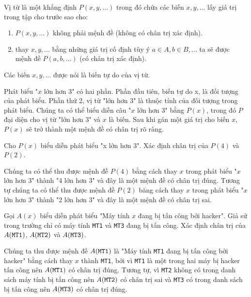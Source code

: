 \documentclass[11pt,fleqn]{book} %
\begin{document}
        \begin{definition}
            Vị từ là một khẳng định $P(x, y, ...)$ trong đó chứa các biến $x, y, ...$ lấy giá trị trong tập cho trước sao cho:
            \begin{enumerate}
                \item $P(x, y, ...)$ không phải mệnh đề (không có chân trị xác định).
                \item thay $x, y, ...$ bằng những giá trị cố định tùy ý $a \in A, b \in B, ...$ ta sẽ được mệnh đề $P(a, b, ...)$ (có chân trị xác định).
            \end{enumerate}
            Các biến $x, y, ...$ được nói là biến tự do của vị từ.
        \end{definition}
        
        Phát biểu "$x$ lớn hơn 3" có hai phần. Phần đầu tiên, biến tự do x, là đối tượng của phát biểu. Phần thứ 2, vị từ "lớn hơn 3" là thuộc tính của đối tượng trong phát biểu. Chúng ta có thể biểu diễn câu "$x$ lớn hơn 3" bằng $P(x)$, trong đó $P$ đại diện cho vị từ "lớn hơn 3" và $x$ là biến. Sau khi gán một giá trị cho biến $x$, $P(x)$ sẽ trở thành một mệnh đề có chân trị rõ ràng. 
        
        \begin{example}
            Cho $P(x)$ biểu diễn phát biểu "x lớn hơn 3". Xác định chân trị của $P(4)$ và $P(2)$.
        \end{example}
        
        Chúng ta có thể thu được mệnh đề $P(4)$ bằng cách thay $x$ trong phát biểu "$x$ lớn hơn 3" thành "4 lớn hơn 3" và đây là một mệnh đề có chân trị đúng. Tương tự chúng ta có thể thu được mệnh đề $P(2)$ băng cách thay $x$ trong phát biểu "$x$ lớn hơn 3" thành "2 lớn hơn 3" và đây là một mệnh đề có chân trị sai. 
        
        \begin{example}
            Gọi $A(x)$ biểu diễn phát biểu "Máy tính $x$ đang bị tấn công bởi hacker". Giả sử trong trường chỉ có máy tính \texttt{MT1} và \texttt{MT3} đang bị tấn công. Xác định chân trị của $A(\text{\texttt{MT1}})$, $A(\text{\texttt{MT2}})$ và $A(\text{\texttt{MT3}})$.
        \end{example}
        
        Chúng ta thu được mệnh đề $A(\text{\texttt{MT1}})$ là "Máy tính \texttt{MT1} đang bị tấn công bởi hacker" bằng cách thay $x$ thành \texttt{MT1}, bởi vì \texttt{MT1} là một trong hai máy bị hacker tấn công nên $A(\text{\texttt{MT1}})$ có chân trị đúng. Tương tự, vì \texttt{MT2} không có trong danh sách máy tính bị tấn công nên $A(\text{\texttt{MT2}})$ có chân trị sai và \texttt{MT3} có trong danh sách bị tấn công nên $A(\text{\texttt{MT3}})$ có chân trị đúng.
        
\end{document}
